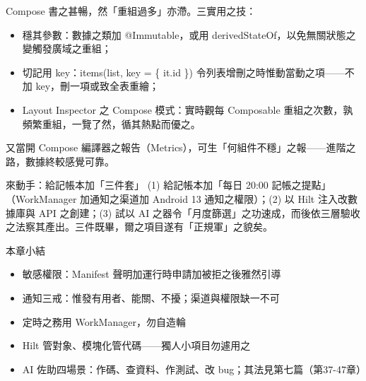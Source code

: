 Compose 書之甚暢，然「重組過多」亦滯。三實用之技：

\begin{itemize}
  \item 穩其參數：數據之類加 @Immutable，或用 derivedStateOf，以免無關狀態之變觸發廣域之重組；
  \item 切記用 key：items(list, key = \{ it.id \}) 令列表增刪之時惟動當動之項——不加 key，刪一項或致全表重繪；
  \item Layout Inspector 之 Compose 模式：實時觀每 Composable 重組之次數，孰頻繁重組，一覽了然，循其熱點而優之。
\end{itemize}

又當開 Compose 編譯器之報告（Metrics），可生「何組件不穩」之報——進階之路，數據終較感覺可靠。

\begin{tcbpractice}{來動手：給記帳本加「三件套」}
(1) 給記帳本加「每日 20:00 記帳之提點」（WorkManager 加通知之渠道加 Android 13 通知之權限）；(2) 以 Hilt 注入改數據庫與 API 之創建；(3) 試以 AI 之器令「月度篩選」之功速成，而後依三層驗收之法察其產出。三件既畢，爾之項目遂有「正規軍」之貌矣。

\end{tcbpractice}

\begin{tcbsummary}{本章小結}
\begin{itemize}
  \item 敏感權限：Manifest 聲明加運行時申請加被拒之後雅然引導
  \item 通知三戒：惟發有用者、能關、不擾；渠道與權限缺一不可
  \item 定時之務用 WorkManager，勿自造輪
  \item Hilt 管對象、模塊化管代碼——獨人小項目勿遽用之
  \item AI 佐助四場景：作碼、查資料、作測試、改 bug；其法見第七篇（第37-47章）
\end{itemize}

\end{tcbsummary}
